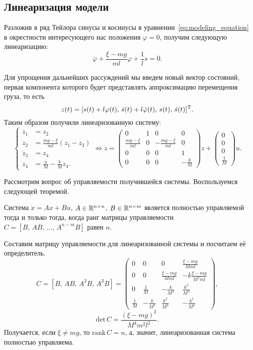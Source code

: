 \subsection{Линеаризация модели}

Разложив в ряд Тейлора синусы и косинусы в уравнении~\eqref{eq:modeling_equation} в окрестности интересующего нас положения $\varphi = 0$, получим следующую линеаризацию:
$$
	\ddot \varphi + \frac{\xi - mg}{ml} \varphi + \frac{1}{l} \ddot s = 0.
$$

Для упрощения дальнейших рассуждений мы введем новый вектор состояний, первая компонента которого будет представлять аппроксимацию перемещения груза, то есть
$$
	z(t) = [s(t) + l\varphi(t),\,\dot s(t) + l\dot\varphi(t),\,s(t),\,\dot s(t)]^\mathrm{T}.
$$
Таким образом получили линеаризованную систему:
\begin{equation}\label{eq:linear_system}
	\left\{
	\begin{aligned}
\dot z_1 &= z_2
\\
\dot z_2 &= \frac{mg - \xi}{ml} (z_1 - z_3)
\\
\dot z_3 &= z_4
\\
\dot z_4 &= \frac{u}{M} - \frac{k}{M}z_4.
	\end{aligned}
	\right.
	\Longleftrightarrow
	\dot z =
	\begin{pmatrix}
0 & 1 & 0 & 0
\\
\frac{mg - \xi}{ml} & 0 & -\frac{mg - \xi}{ml} & 0
\\
0 & 0 & 0 & 1
\\
0 & 0 & 0 & -\frac{k}{M}
	\end{pmatrix}
	z
	+
	\begin{pmatrix}
0 \\ 0 \\ 0 \\ \frac{1}{M}
	\end{pmatrix}
	u.
\end{equation}

Рассмотрим вопрос об управляемости получившейся системы. Воспользуемся следующей теоремой.
\begin{theorem}
	Система $\dot x = Ax + Bu$, $A \in \mathbb{R}^{n\times n}$, $B \in \mathbb{R}^{n \times m}$ является полностью управляемой тогда и только тогда, когда ранг матрицы управляемости $C = [B,\,AB,\,\ldots,\,A^{n-m}B]$ равен $n$.
\end{theorem}
Составим матрицу управляемости для линеаризованной системы и посчитаем её определитель.
$$
	C = [B,\,AB,\,A^2 B,\, A^3B] = 
	\begin{pmatrix}
0 & 0 & 0 & \frac{\xi - mg}{M m l}
\\
0 & 0 & \frac{\xi - mg}{M m l} & -k\frac{\xi - mg}{M^2ml}
\\
0 & \frac{1}{M} & -\frac{k}{M^2} & \frac{k^2}{M^3}
\\
\frac{1}{M} & -\frac{k}{M^2} & \frac{k^2}{M^3} & -\frac{k^3}{M^4}
	\end{pmatrix},
$$
$$
	\mathrm{det}\,C = \frac{(\xi - mg)^2}{M^4m^2l^2}.
$$
Получается, если $\xi \neq mg$, то $\mathrm{rank}\,C = n$, а, значит, линеаризованная система полностью управляема.